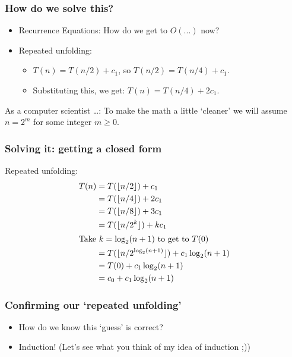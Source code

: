 \begin{frame}
	\frametitle{How do we solve this?}

				\begin{itemize}
					\item Recurrence Equations: How do we get to $O(...)$ now?
	
					\item Repeated unfolding:
				\begin{itemize}
					\item $T(n) = T(n/2) +c_1$, so $T(n/2) = T(n/4) + c_1$.
					\item Substituting this, we get: $T(n) = T(n/4) + 2c_1$.
		\end{itemize}	
					
	\end{itemize}
	
As a computer scientist \ldots:
		To make the math a little `cleaner' we will assume $n = 2^m$ for some integer $m \geq 0$.	
\end{frame}

\begin{frame}
	\frametitle{Solving it: getting a closed form}

	Repeated unfolding:
	\begin{align*}
		T(n) &= T(\lfloor n/2 \rfloor) + c_1\\
				 &= T(\lfloor n/4 \rfloor) + 2c_1\\
				 &= T(\lfloor n/8 \rfloor) + 3c_1\\
				 &= T(\lfloor n/2^k \rfloor) + kc_1\\
		\intertext{Take $k= \log_2(n+1)$ to get to $T(0)$}
		     &= T(\lfloor n/2^{\log_2(n+1)} \rfloor) + c_1\log_2(n+1)\\
				 &= T(0) + c_1\log_2(n+1)\\
				 &= c_0 + c_1\log_2(n+1)
	\end{align*}
\end{frame}

\begin{frame}
	\frametitle{Confirming our `repeated unfolding'}
				\begin{itemize}
					\item How do we know this `guess' is correct?	
					\item Induction! (Let's see what you think of my idea of induction ;))
	\end{itemize}
\end{frame}

